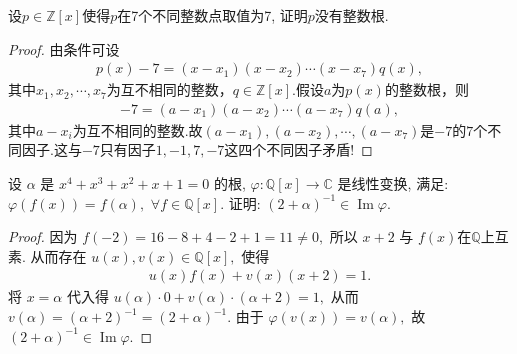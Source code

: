 \documentclass[../../main.tex]{subfiles}%
\begin{document}
\begin{example}
设$ p \in \mathbb{Z}[x] $使得$ p $在7个不同整数点取值为7, 证明$ p $没有整数根.
\end{example}
\begin{proof}
由条件可设
\begin{align*}
p\left( x \right) -7=\left( x-x_1 \right) \left( x-x_2 \right) \cdots \left( x-x_7 \right) q\left( x \right),
\end{align*}
其中$x_1,x_2,\cdots,x_7$为互不相同的整数，$q\in \mathbb{Z}[x]$.假设$a$为$p\left( x \right)$的整数根，则
\begin{align*}
-7=\left( a-x_1 \right) \left( a-x_2 \right) \cdots \left( a-x_7 \right) q\left( a \right),
\end{align*}
其中$a-x_i$为互不相同的整数.故$\left( a-x_1 \right),\left( a-x_2 \right),\cdots,\left( a-x_7 \right)$是$-7$的$7$个不同因子.这与$-7$只有因子$1,-1,7,-7$这四个不同因子矛盾!
\end{proof}

\begin{example}
设 $\alpha$ 是 $x^4+x^3+x^2+x+1=0$ 的根, $\varphi: \mathbb{Q}[x] \to \mathbb{C}$ 是线性变换, 满足: $\varphi(f(x))=f(\alpha),$ \(\forall f \in \mathbb{Q}[x].\) 证明: $(2+\alpha)^{-1} \in \operatorname{Im} \varphi.$
\end{example}
\begin{proof}
因为 $f(-2)=16-8+4-2+1=11\ne 0,$ 所以 \(x+2\) 与 \(f(x)\)在$\mathbb{Q}$上互素. 从而存在 $u(x), v(x) \in \mathbb{Q}[x],$ 使得
\begin{align*}
u(x)f(x)+v(x)(x+2)=1.
\end{align*}
将 \(x=\alpha\) 代入得 $u(\alpha)\cdot 0+v(\alpha)\cdot(\alpha+2)=1,$ 从而 $v(\alpha)=(\alpha+2)^{-1}=(2+\alpha)^{-1}.$ 由于 $\varphi(v(x))=v(\alpha),$ 故 $(2+\alpha)^{-1}\in \operatorname{Im} \varphi.$\end{proof}
\end{document}
